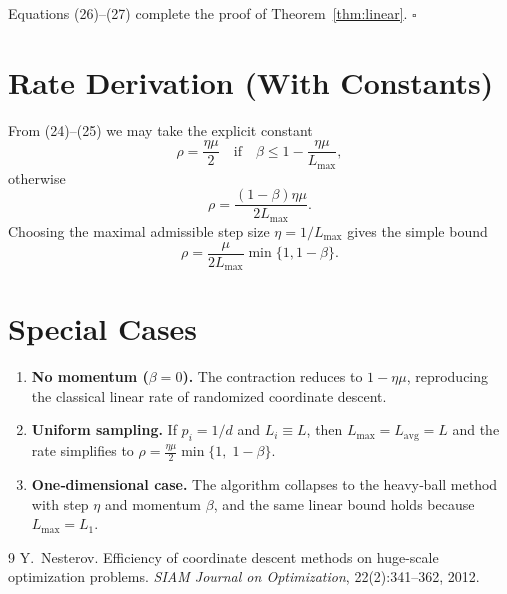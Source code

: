 \documentclass{article}
\begin{document}
Equations (26)–(27) complete the proof of Theorem~\ref{thm:linear}. \hfill $\square$

\section*{Rate Derivation (With Constants)}
From (24)–(25) we may take the explicit constant
\[
\rho
= \frac{\eta\mu}{2}
  \quad\text{if}\quad
  \beta\le 1-\frac{\eta\mu}{L_{\max}},
\]
otherwise
\[
\rho
= \frac{(1-\beta)\eta\mu}{2L_{\max}}.
\]
Choosing the maximal admissible step size $\eta=1/L_{\max}$ gives the simple bound
\[
\rho = \frac{\mu}{2L_{\max}}\min\{1,1-\beta\}.
\]

\section*{Special Cases}
\begin{enumerate}
    \item \textbf{No momentum ($\beta=0$).} The contraction reduces to $1-\eta\mu$, reproducing the classical linear rate of randomized coordinate descent.
    \item \textbf{Uniform sampling.} If $p_i=1/d$ and $L_i\equiv L$, then $L_{\max}=L_{\mathrm{avg}}=L$ and the rate simplifies to
    $\rho = \frac{\eta\mu}{2}\min\{1,\;1-\beta\}$.
    \item \textbf{One‑dimensional case.} The algorithm collapses to the heavy‑ball method with step $\eta$ and momentum $\beta$, and the same linear bound holds because $L_{\max}=L_1$.
\end{enumerate}

\begin{thebibliography}{9}
Y.~Nesterov.
\newblock Efficiency of coordinate descent methods on huge-scale optimization problems.
\newblock \emph{SIAM Journal on Optimization}, 22(2):341--362, 2012.
\end{thebibliography}
\end{document}
